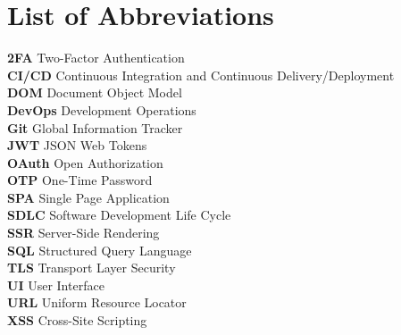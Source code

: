 \documentclass[a4paper, 11pt, oneside]{Thesis}  %
\begin{document}
\listoffigures  %

\listoftables  %

\chapter*{List of Abbreviations}  %
\begin{tabbing}
    \textbf{2FA} Two-Factor Authentication\\
    \textbf{CI/CD} Continuous Integration and Continuous Delivery/Deployment\\
    \textbf{DOM} Document Object Model\\
    \textbf{DevOps} Development Operations\\
    \textbf{Git} Global Information Tracker\\
    \textbf{JWT} JSON Web Tokens\\
    \textbf{OAuth} Open Authorization\\
    \textbf{OTP} One-Time Password\\
    \textbf{SPA} Single Page Application\\
    \textbf{SDLC} Software Development Life Cycle\\
    \textbf{SSR} Server-Side Rendering\\
    \textbf{SQL} Structured Query Language\\
    \textbf{TLS} Transport Layer Security\\
    \textbf{UI} User Interface\\
    \textbf{URL} Uniform Resource Locator\\
    \textbf{XSS} Cross-Site Scripting\\
\end{tabbing}



\end{document}
